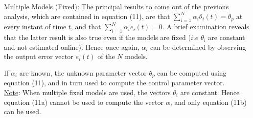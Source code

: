 \documentclass[conference]{IEEEtran}
\begin{document}
{\large \underline{Multiple Models (Fixed)}}: The principal results to come out of the previous analysis, which are contained in equation (11), are that $\sum_{i=1}^{N}\alpha_{i}\theta_{i}(t)=\theta_{p}$ at every instant of time $t$, and that $\sum_{i=1}^{N}\alpha_{i}e_{i}(t)=0$. A brief examination reveals that the latter result is also true even if the models are fixed ($i.e$ $\theta_{i}$ are constant and not estimated online). Hence once again, $\alpha_{i}$ can be determined by observing the output error vector $e_{i}(t)$ of the $N$ models.

If $\alpha_{i}$ are known, the unknown parameter vector $\theta_{p}$ can be computed using equation (11), and in turn used to compute the control parameter vector.\\
{\large \underline{Note}}: When multiple fixed models are used, the vectors $\theta_{i}$ are constant. Hence equation (11a) cannot be used to compute the vector $\alpha$, and only equation (11b) can be used.
\end{document}

